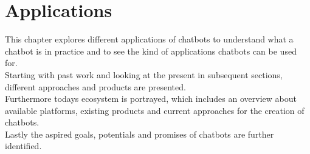 \chapter{Applications}


This chapter explores different applications of chatbots
to understand what a chatbot is in practice and to see the kind of applications chatbots can be used for.
\\
Starting with past work and looking at the present in subsequent sections,
different approaches and products are presented.
\\
Furthermore todays ecosystem is portrayed,
which includes an overview about available platforms,
existing products
and current approaches for the creation of chatbots.
\\
Lastly the aspired goals, potentials and promises of chatbots are further identified.
